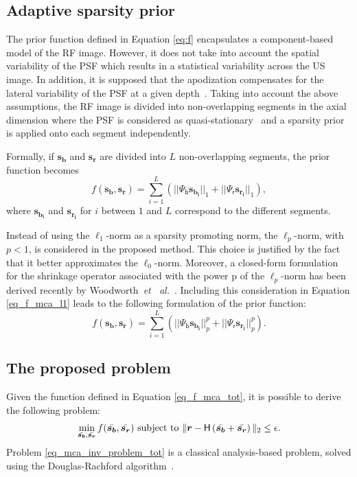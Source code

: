 \documentclass[conference]{IEEEtran}
\begin{document}
\subsection{Adaptive sparsity prior}
\label{subsec:local_sparsity_prior}
The prior function defined in Equation \eqref{eq:f} encapsulates a component-based model of the RF image. However, it does not take into account the spatial variability of the PSF which results in a statistical variability across the US image. In addition, it is supposed that the apodization compensates for the lateral variability of the PSF at a given depth~\cite{Michailovich_TMI_2005}. Taking into account the above assumptions, the RF image is divided into non-overlapping segments in the axial dimension where the PSF is considered as quasi-stationary~\cite{Michailovich_TMI_2005} and a sparsity prior is applied onto each segment independently.
\par Formally, if $\bm{s_b}$ and $\bm{s_r}$ are divided into $L$ non-overlapping segments, the prior function becomes 
\begin{equation}
\label{eq_f_mca_l1}
f \left(\bm{s_{b}}, \bm{s_r} \right) = \sum \limits_{i = 1}^{L} \left(|| \mathsf{\Psi_b} \bm{s_{b_i}} ||_1 + || \mathsf{\Psi_r} \bm{s_{r_i}} ||_1\right),
\end{equation}
where $\bm{s_{b_i}}$ and $\bm{s_{r_i}}$ for $i$ between $1$ and $L$ correspond to the different segments.
\par Instead of using the $\ell_1$-norm as a sparsity promoting norm, the $\ell_p$-norm, with $p < 1$, is considered in the proposed method. This choice is justified by the fact that it better approximates the $\ell_0$-norm. Moreover, a closed-form formulation for the shrinkage operator associated with the power p of the $\ell_p$-norm has been derived recently by Woodworth~\textit{et~ al.}~\cite{Woodworth_IP_2016}. Including this consideration in Equation \eqref{eq_f_mca_l1} leads to the following formulation of the prior function:
\begin{equation}
\label{eq_f_mca_tot}
f \left(\bm{s_{b}}, \bm{s_r} \right) = \sum \limits_{i = 1}^{L} \left(|| \mathsf{\Psi_b} \bm{s_{b_i}} ||_p^p + || \mathsf{\Psi_r} \bm{s_{r_i}} ||_p^p\right).
\end{equation}
\subsection{The proposed problem}
\label{subsec_proposed_pb}
Given the function defined in Equation \eqref{eq_f_mca_tot}, it is possible to derive the following problem:
\begin{equation}
\label{eq_mca_inv_problem_tot}
\min_{\bar{\bm{s_b}}, \bar{\bm{s_r}}} f(\bar{\bm{s_b}}, \bar{\bm{s_r}})
\textnormal{ subject to }\| \bm{r}-\mathsf{H}\left(\bar{\bm{s_b}} + \bar{\bm{s_r}}\right)\|_{2}\leq\epsilon.
\end{equation}
Problem \eqref{eq_mca_inv_problem_tot} is a classical analysis-based problem, solved using the Douglas-Rachford algorithm~\cite{Combettes_TSP_2007}.
\end{document}
